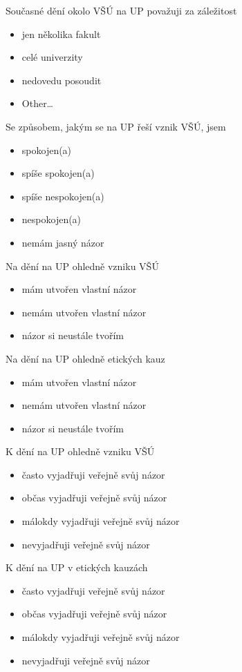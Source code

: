 \bigskip
Současné dění okolo VŠÚ na UP považuji za záležitost
\begin{itemize}
      \item jen několika fakult
      \item celé univerzity
      \item nedovedu posoudit
      \item Other…
\end{itemize}

Se způsobem, jakým se na UP řeší vznik VŠÚ, jsem
\begin{itemize}
      \item spokojen(a)
      \item spíše spokojen(a)
      \item spíše nespokojen(a)
      \item nespokojen(a)
      \item nemám jasný názor
\end{itemize}

Na dění na UP ohledně vzniku VŠÚ
\begin{itemize}
      \item mám utvořen vlastní názor
      \item nemám utvořen vlastní názor
      \item názor si neustále tvořím
\end{itemize}

Na dění na UP ohledně etických kauz
\begin{itemize}
      \item mám utvořen vlastní názor
      \item nemám utvořen vlastní názor
      \item názor si neustále tvořím
\end{itemize}

K dění na UP ohledně vzniku VŠÚ
\begin{itemize}
      \item často vyjadřuji veřejně svůj názor
      \item občas vyjadřuji veřejně svůj názor
      \item málokdy vyjadřuji veřejně svůj názor
      \item nevyjadřuji veřejně svůj názor
\end{itemize}

K dění na UP v etických kauzách
\begin{itemize}
      \item často vyjadřuji veřejně svůj názor
      \item občas vyjadřuji veřejně svůj názor
      \item málokdy vyjadřuji veřejně svůj názor
      \item nevyjadřuji veřejně svůj názor
\end{itemize}

